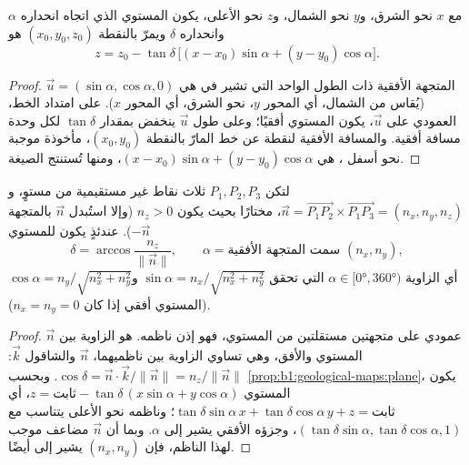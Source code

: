 \begin{proposition}\label{prop:b1:geological-maps:plane}
مع $x$ نحو الشرق، و$y$ نحو الشمال، و$z$ نحو الأعلى، يكون المستوي الذي اتجاه انحداره $\alpha$ وانحداره $\delta$ ويمرّ بالنقطة $(x_0, y_0, z_0)$ هو
\[
  z = z_0 - \tan\delta\,\bigl[(x - x_0)\sin\alpha + (y - y_0)\cos\alpha\bigr].
\]
\end{proposition}

\begin{proof}
المتجهة الأفقية ذات الطول الواحد التي تشير في  هي
$\vec u = (\sin\alpha, \cos\alpha, 0)$ (يُقاس  من الشمال، أي المحور $y$، نحو الشرق، أي المحور $x$). على امتداد الخط، العمودي على
$\vec u$، يكون المستوي أفقيًا؛ وعلى طول $\vec u$ ينخفض بمقدار
$\tan\delta$ لكل وحدة مسافة أفقية. والمسافة الأفقية لنقطة عن خط  المارّ بالنقطة $(x_0, y_0)$، مأخوذة موجبة نحو أسفل ، هي
$(x-x_0)\sin\alpha + (y-y_0)\cos\alpha$، ومنها تُستنتج الصيغة.
\end{proof}

\begin{theorem}\label{thm:b1:geological-maps:three-point}
لتكن $P_1, P_2, P_3$ ثلاث نقاط غير مستقيمية من مستوٍ، و
$\vec n = \overrightarrow{P_1P_2} \times \overrightarrow{P_1P_3} =
(n_x, n_y, n_z)$، مختارًا بحيث يكون $n_z > 0$ (وإلا استُبدل $\vec n$ بالمتجهة $-\vec n$). عندئذٍ يكون   للمستوي
\[
  \delta = \arccos\frac{n_z}{\|\vec n\|}, \qquad
  \alpha = \text{سمت المتجهة الأفقية } (n_x, n_y),
\]
أي الزاوية $\alpha \in [\ang{0}, \ang{360})$ التي تحقق
$\sin\alpha = n_x/\sqrt{n_x^2+n_y^2}$ و$\cos\alpha = n_y/\sqrt{n_x^2+n_y^2}$
(المستوي أفقي إذا كان $n_x = n_y = 0$).
\end{theorem}

\begin{proof}
$\vec n$ عمودي على متجهتين مستقلتين من المستوي، فهو إذن ناظمه.  هو الزاوية بين المستوي والأفق، وهي تساوي الزاوية بين ناظميهما، $\vec n$ والشاقول
$\vec k$: $\cos\delta = \vec n \cdot \vec k / \|\vec n\| = n_z/\|\vec n\|$.
وبحسب \cref{prop:b1:geological-maps:plane}، يكون المستوي $z = \text{ثابت} -
\tan\delta\,(x\sin\alpha + y\cos\alpha)$، أي
$\tan\delta\sin\alpha\,x + \tan\delta\cos\alpha\,y + z = \text{ثابت}$؛ وناظمه نحو الأعلى يتناسب مع $(\tan\delta\sin\alpha,
\tan\delta\cos\alpha, 1)$، وجزؤه الأفقي يشير إلى  $\alpha$. وبما أن $\vec n$ مضاعف موجب لهذا الناظم، فإن $(n_x, n_y)$ يشير إلى  أيضًا.
\end{proof}

